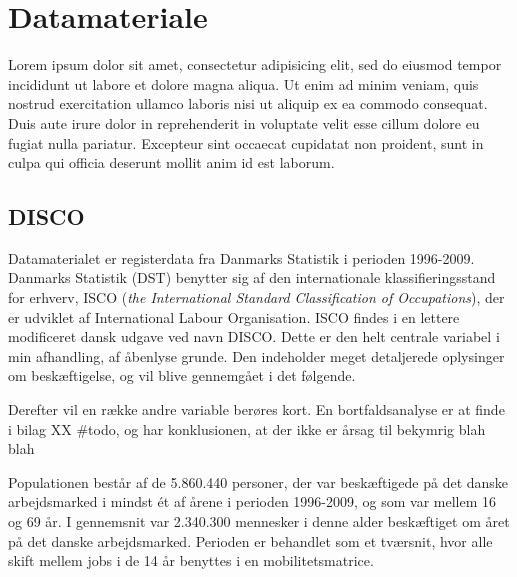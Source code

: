 

\chapter{Datamateriale \label{kapitel_metode_datamateriale}}

Lorem ipsum dolor sit amet, consectetur adipisicing elit, sed do eiusmod
tempor incididunt ut labore et dolore magna aliqua. Ut enim ad minim veniam,
quis nostrud exercitation ullamco laboris nisi ut aliquip ex ea commodo
consequat. Duis aute irure dolor in reprehenderit in voluptate velit esse
cillum dolore eu fugiat nulla pariatur. Excepteur sint occaecat cupidatat non
proident, sunt in culpa qui officia deserunt mollit anim id est laborum.

\section{DISCO}


Datamaterialet er registerdata fra Danmarks Statistik%
i perioden 1996-2009. Danmarks Statistik (DST) benytter sig af den internationale klassifieringsstand for erhverv, ISCO (\emph{the International Standard Classification of Occupations}), der er udviklet af International Labour Organisation. ISCO findes i en lettere modificeret dansk udgave ved navn DISCO. Dette er den helt centrale variabel i min afhandling, af åbenlyse grunde. Den indeholder meget detaljerede oplysinger om beskæftigelse, og vil blive gennemgået i det følgende. 

Derefter vil en række andre variable berøres kort. En bortfaldsanalyse er at finde i bilag XX \#todo, og har konklusionen, at der ikke er årsag til bekymrig blah blah  

Populationen består af de 5.860.440 personer, der var beskæftigede på det danske arbejdsmarked i mindst ét af årene i perioden 1996-2009, og som var mellem 16 og 69 år. I gennemsnit var 2.340.300 mennesker i denne alder beskæftiget om året på det danske arbejdsmarked. Perioden er behandlet som et tværsnit, hvor alle skift mellem jobs i de 14 år benyttes i en mobilitetsmatrice. 



